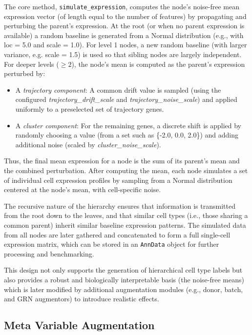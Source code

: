 \documentclass{article}
\begin{document}
The core method, \texttt{simulate\_expression}, computes the node's noise-free mean expression vector (of length equal to the number of features) by propagating and perturbing the parent's expression. At the root (or when no parent expression is available) a random baseline is generated from a Normal distribution (e.g., with loc = 5.0 and scale = 1.0). For level 1 nodes, a new random baseline (with larger variance, e.g. scale = 1.5) is used so that sibling nodes are largely independent. For deeper levels ($\ge2$), the node's mean is computed as the parent's expression perturbed by:
\begin{itemize}
	\item A \emph{trajectory component}: A common drift value is sampled (using the configured \emph{trajectory\_drift\_scale} and \emph{trajectory\_noise\_scale}) and applied uniformly to a preselected set of trajectory genes.
	\item A \emph{cluster component}: For the remaining genes, a discrete shift is applied by randomly choosing a value (from a set such as \{-2.0, 0.0, 2.0\}) and adding additional noise (scaled by \emph{cluster\_noise\_scale}).
\end{itemize}
Thus, the final mean expression for a node is the sum of its parent's mean and the combined perturbation. After computing the mean, each node simulates a set of individual cell expression profiles by sampling from a Normal distribution centered at the node's mean, with cell-specific noise.

The recursive nature of the hierarchy ensures that information is transmitted from the root down to the leaves, and that similar cell types (i.e., those sharing a common parent) inherit similar baseline expression patterns. The simulated data from all nodes are later gathered and concatenated to form a full single-cell expression matrix, which can be stored in an \texttt{AnnData} object for further processing and benchmarking.

This design not only supports the generation of hierarchical cell type labels but also provides a robust and biologically interpretable basis (the noise-free means) which is later modified by additional augmentation modules (e.g., donor, batch, and GRN augmentors) to introduce realistic effects.



\subsection{Meta Variable Augmentation}
\label{sec:meta_variable_augmentation}
\end{document}

